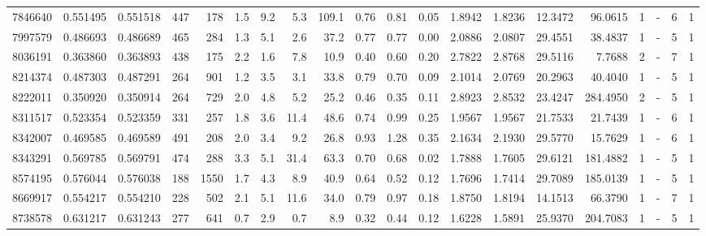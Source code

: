 \begin{tabular}{rrrrrrrrrrrrrrrrrlrl}
   7846640 & 0.551495 & 0.551518 &  447 &  178 &      1.5 &      9.2 &     5.3 &   109.1 &   0.76 &   0.81 &       0.05 &  1.8942 &  1.8236 &   12.3472 &   96.0615 &       1 &             - &        6 &         1 \\
   7997579 & 0.486693 & 0.486689 &  465 &  284 &      1.3 &      5.1 &     2.6 &    37.2 &   0.77 &   0.77 &       0.00 &  2.0886 &  2.0807 &   29.4551 &   38.4837 &       1 &             - &        5 &         1 \\
   8036191 & 0.363860 & 0.363893 &  438 &  175 &      2.2 &      1.6 &     7.8 &    10.9 &   0.40 &   0.60 &       0.20 &  2.7822 &  2.8768 &   29.5116 &    7.7688 &       2 &             - &        7 &         1 \\
   8214374 & 0.487303 & 0.487291 &  264 &  901 &      1.2 &      3.5 &     3.1 &    33.8 &   0.79 &   0.70 &       0.09 &  2.1014 &  2.0769 &   20.2963 &   40.4040 &       1 &             - &        5 &         1 \\
   8222011 & 0.350920 & 0.350914 &  264 &  729 &      2.0 &      4.8 &     5.2 &    25.2 &   0.46 &   0.35 &       0.11 &  2.8923 &  2.8532 &   23.4247 &  284.4950 &       2 &             - &        5 &         1 \\
   8311517 & 0.523354 & 0.523359 &  331 &  257 &      1.8 &      3.6 &    11.4 &    48.6 &   0.74 &   0.99 &       0.25 &  1.9567 &  1.9567 &   21.7533 &   21.7439 &       1 &             - &        6 &         1 \\
   8342007 & 0.469585 & 0.469589 &  491 &  208 &      2.0 &      3.4 &     9.2 &    26.8 &   0.93 &   1.28 &       0.35 &  2.1634 &  2.1930 &   29.5770 &   15.7629 &       1 &             - &        6 &         1 \\
   8343291 & 0.569785 & 0.569791 &  474 &  288 &      3.3 &      5.1 &    31.4 &    63.3 &   0.70 &   0.68 &       0.02 &  1.7888 &  1.7605 &   29.6121 &  181.4882 &       1 &             - &        5 &         1 \\
   8574195 & 0.576044 & 0.576038 &  188 & 1550 &      1.7 &      4.3 &     8.9 &    40.9 &   0.64 &   0.52 &       0.12 &  1.7696 &  1.7414 &   29.7089 &  185.0139 &       1 &             - &        5 &         1 \\
   8669917 & 0.554217 & 0.554210 &  228 &  502 &      2.1 &      5.1 &    11.6 &    34.0 &   0.79 &   0.97 &       0.18 &  1.8750 &  1.8194 &   14.1513 &   66.3790 &       1 &             - &        7 &         1 \\
   8738578 & 0.631217 & 0.631243 &  277 &  641 &      0.7 &      2.9 &     0.7 &     8.9 &   0.32 &   0.44 &       0.12 &  1.6228 &  1.5891 &   25.9370 &  204.7083 &       1 &             - &        5 &         1 \\

\end{tabular}
